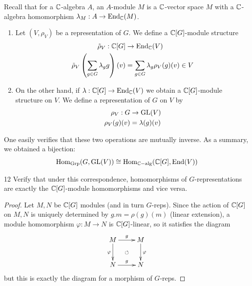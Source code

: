 \documentclass[twoside = false,	%
		headsepline,		%
		parskip = true,
		]{scrbook}						%
\begin{document}
        Recall that for a $\mathbb C$-algebra $A$, an $A$-module $M$ is a $\mathbb C$-vector space $M$ with a $\mathbb C$-algebra homomorphism $\lambda_M: A \to \mathrm{End}_\mathbb C(M)$.
        \begin{enumerate}
            \item Let $(V,\rho_V)$ be a representation of $G$. We define a $\mathbb C[G]$-module structure
            \begin{equation*}
            \begin{split}
                \tilde{\rho}_V: \mathbb C[G] &\to \mathrm{End}_\mathbb C(V) \\
                                \tilde{\rho}_V\left( \sum_{g \in G} \lambda_g g\right)(v) &= \sum_{g \in G} \lambda_g \rho_V(g)(v) \in V
            \end{split}
            \end{equation*}
            \item On the other hand, if $\lambda: \mathbb C[G] \to \mathrm{End}_\mathbb C(V)$ we obtain a $\mathbb C[G]$-module structure on $V$. We define a representation of $G$ on $V$ by
            \begin{equation*}
            \begin{split}
                \rho_V: G &\to \mathrm{GL}(V) \\  
                        \rho_V(g)(v) &= \lambda(g)(v)
            \end{split}
            \end{equation*}
        \end{enumerate}
        One easily verifies that these two operations are mutually inverse. As a summary, we obtained a bijection:
        \begin{equation*}
            \mathrm{Hom}_{\mathrm{Grp}}(G,\mathrm{GL}(V)) \cong \mathrm{Hom}_{\mathbb C\mathrm{-alg}}(\mathbb C[G],\mathrm{End}(V))
        \end{equation*}
        \begin{exercise}{}{12}
            Verify that under this correspondence, homomorphisms of $G$-representations are exactly the $\mathbb C[G]$-module homomorphisms and vice versa.
        \end{exercise}
        \begin{proof}
            Let $M,N$ be $\mathbb C[G]$ modules (and in turn $G$-reps). Since the action of $\mathbb C[G]$ on $M, N$ is uniquely determined by $g.m = \rho(g)(m)$ (linear extension), a module homomorphism $\varphi: M \to N$ is $\mathbb C[G]$-linear, so it satisfies the diagram
            \begin{equation*}
            \xymatrix {
                M\ar[d]_{\varphi} \ar[r]^{g} & M \ar[d]^{\varphi} \\
                N \ar[r]^{g}& N\ar@{}|{\circlearrowleft}[ul]
            }
            \end{equation*}
            but this is exactly the diagram for a morphism of $G$-reps.
        \end{proof}
\end{document}
